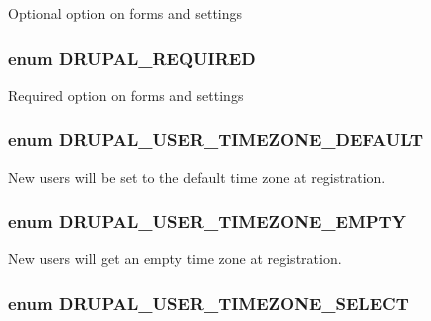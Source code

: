 \label{system_8module_a1a7cc24228e990770cd55d79ba00e95e}
Optional option on forms and settings \hypertarget{system_8module_a0803ed1ab561db08e075e74427ecedd5}{
\subsubsection[{DRUPAL\_\-REQUIRED}]{\setlength{\rightskip}{0pt plus 5cm}enum {\bf DRUPAL\_\-REQUIRED}}}
\label{system_8module_a0803ed1ab561db08e075e74427ecedd5}
Required option on forms and settings \hypertarget{system_8module_aabf97d0cd9173075e9d66e1acb2a6b7f}{
\subsubsection[{DRUPAL\_\-USER\_\-TIMEZONE\_\-DEFAULT}]{\setlength{\rightskip}{0pt plus 5cm}enum {\bf DRUPAL\_\-USER\_\-TIMEZONE\_\-DEFAULT}}}
\label{system_8module_aabf97d0cd9173075e9d66e1acb2a6b7f}
New users will be set to the default time zone at registration. \hypertarget{system_8module_a36f2231e8e443e860d5c67782a472542}{
\subsubsection[{DRUPAL\_\-USER\_\-TIMEZONE\_\-EMPTY}]{\setlength{\rightskip}{0pt plus 5cm}enum {\bf DRUPAL\_\-USER\_\-TIMEZONE\_\-EMPTY}}}
\label{system_8module_a36f2231e8e443e860d5c67782a472542}
New users will get an empty time zone at registration. \hypertarget{system_8module_a7df7638d437b7a705dfdb48f46b083e2}{
\subsubsection[{DRUPAL\_\-USER\_\-TIMEZONE\_\-SELECT}]{\setlength{\rightskip}{0pt plus 5cm}enum {\bf DRUPAL\_\-USER\_\-TIMEZONE\_\-SELECT}}}
